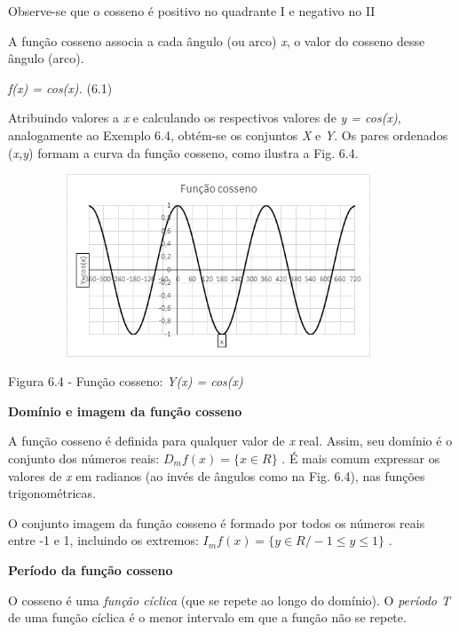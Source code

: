 \begin{texemplo}
Observe-se que o cosseno é positivo no quadrante I e negativo no II \qedsymbol
\end{texemplo}

\begin{caixa}
A função cosseno associa a cada ângulo (ou arco) \textit{x}, o valor do cosseno desse ângulo (arco).

\textit{f(x) = cos(x).} \tab (6.1)
\end{caixa}
Atribuindo valores a \textit{x} e calculando os respectivos valores de \textit{y = cos(x)}, analogamente ao Exemplo 6.4, obtém-se os conjuntos \textit{X }e\textit{ Y}. Os pares ordenados (\textit{x,y}) formam a curva da função cosseno, como ilustra a Fig. 6.4.

\begin{figure}[H]
    \begin{Center}
        \includegraphics[width=4.11in,height=2.14in]{capitulos/trigonometria_e_funcoes_trigonometricas/media/image31.png}
    \end{Center}
\end{figure}

Figura 6.4 - Função cosseno: \textit{Y(x) = cos(x)}

\textbf{Domínio e imagem da função cosseno}

A função cosseno é definida para qualquer valor de \textit{x} real. Assim, seu domínio é o conjunto dos números reais:  \( D_{m}f \left( x \right) = \{ x \in  R \}  \) . É mais comum expressar os valores de \textit{x} em radianos (ao invés de ângulos como na Fig. 6.4), nas funções trigonométricas.

O conjunto imagem da função cosseno é formado por todos os números reais entre -1 e 1, incluindo os extremos:  \( I_{m}f \left( x \right) = \{ y \in  R/ -1 \leq y \leq 1 \}  \) .

\textbf{Período da função cosseno}

O cosseno é uma \textit{função cíclica} (que se repete ao longo do domínio). O \textit{período T} de uma função cíclica é o menor intervalo em que a função não se repete.

